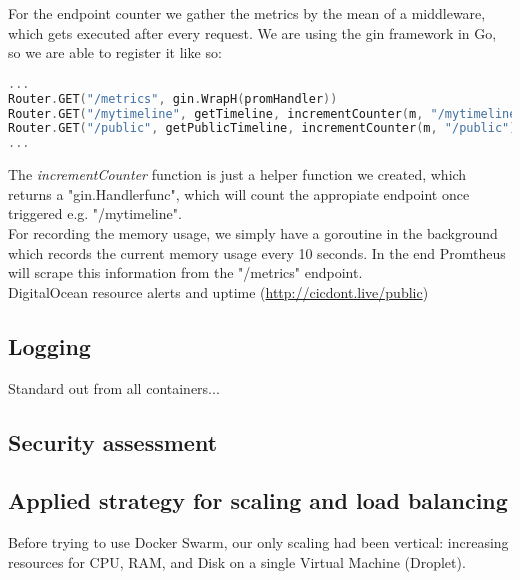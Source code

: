 For the endpoint counter we gather the metrics by the mean of a middleware, which gets executed after every request. We are using the gin framework in Go, so we are able to register it like so:

\begin{lstlisting}[language=Go]
...
Router.GET("/metrics", gin.WrapH(promHandler))
Router.GET("/mytimeline", getTimeline, incrementCounter(m, "/mytimeline"))
Router.GET("/public", getPublicTimeline, incrementCounter(m, "/public"))
...
\end{lstlisting}

The \textit{incrementCounter} function is just a helper function we created, which returns a "gin.Handlerfunc", which will count the appropiate endpoint once triggered e.g. "/mytimeline".\\

For recording the memory usage, we simply have a goroutine in the background which records the current memory usage every 10 seconds. In the end Promtheus will scrape this information from the "/metrics" endpoint.\\


DigitalOcean resource alerts and uptime (\url{http://cicdont.live/public})
\subsection{Logging}
Standard out from all containers...
\subsection{Security assessment}

\subsection{Applied strategy for scaling and load balancing}
Before trying to use Docker Swarm, our only scaling had been vertical: increasing resources for CPU, RAM, and Disk on a single Virtual Machine (Droplet). 

